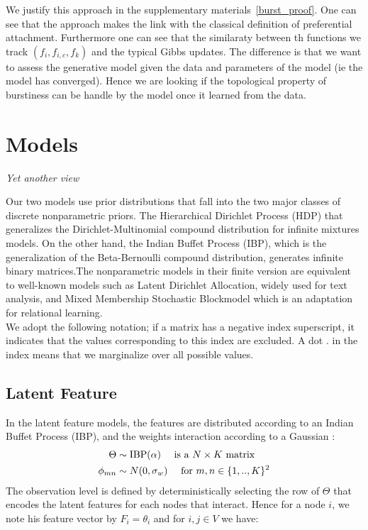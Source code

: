 \documentclass[a4paper, 12pt]{article}
\begin{document}
We justify this approach in the supplementary materials~\ref{burst_proof}. One can see that the approach makes the link with the classical definition of preferential attachment. Furthermore one can see that the similaraty between th functions we track $(f_i, f_{i,c}, f_k)$ and the typical Gibbs updates. The difference is that we want to assess the generative model given the data and parameters of the model (ie the model has converged). Hence we are looking if the topological property of burstiness can be handle by the model once it learned from the data.~\\



\section{Models}
 \hspace{2em} \emph{Yet another view} ~\\
\label{fig:bayes_net}

Our two models use prior distributions that fall into the two major classes of discrete nonparametric priors. The Hierarchical Dirichlet Process (HDP) that generalizes the Dirichlet-Multinomial compound distribution for infinite mixtures models. On the other hand, the Indian Buffet Process (IBP), which is the generalization of the Beta-Bernoulli compound distribution, generates infinite binary matrices.The nonparametric models in their finite version are equivalent to well-known models such as Latent Dirichlet Allocation, widely used for text analysis, and Mixed Membership Stochastic Blockmodel which is an adaptation for relational learning.~\\


We adopt the following notation; if a matrix has a negative index superscript, it indicates that the values corresponding to this index are excluded. A dot $\bm{.}$ in the index means that we marginalize over all possible values.


\subsection{Latent Feature}
In the latent feature models, the features are distributed according to an Indian Buffet Process (IBP), and the weights interaction according to a Gaussian :
\begin{align}
\Theta &\sim \mathrm{IBP}(\alpha)  \quad\textnormal{ is a } N\times K \textnormal{ matrix}\\
\phi_{mn} &\sim N(0, \sigma_w) \quad\textnormal{ for } m,n \in \{1, .., K\}^2
\end{align}
The observation level is defined by deterministically selecting the row of $\Theta$ that encodes the latent features for each nodes that interact. Hence for a node $i$, we note his feature vector by $F_i = \theta_i$ and for $i, j \in V$ we have:
\end{document}
